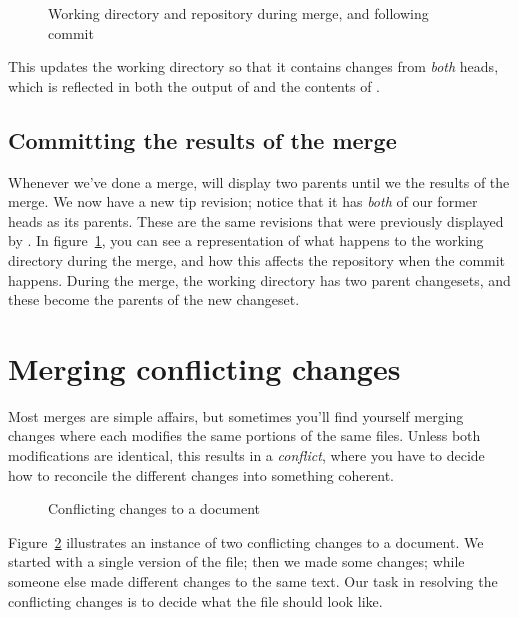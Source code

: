 \begin{figure}[ht]
  \centering
  \caption{Working directory and repository during merge, and
    following commit}
  \label{fig:tour-merge:merge}
\end{figure}

This updates the working directory so that it contains changes from
\emph{both} heads, which is reflected in both the output of
 and the contents of .

\subsection{Committing the results of the merge}

Whenever we've done a merge,  will display two parents
until we  the results of the merge.
We now have a new tip revision; notice that it has \emph{both} of
our former heads as its parents.  These are the same revisions that
were previously displayed by .
In figure~\ref{fig:tour-merge:merge}, you can see a representation of
what happens to the working directory during the merge, and how this
affects the repository when the commit happens.  During the merge, the
working directory has two parent changesets, and these become the
parents of the new changeset.

\section{Merging conflicting changes}

Most merges are simple affairs, but sometimes you'll find yourself
merging changes where each modifies the same portions of the same
files.  Unless both modifications are identical, this results in a
\emph{conflict}, where you have to decide how to reconcile the
different changes into something coherent.

\begin{figure}[ht]
  \centering
  \caption{Conflicting changes to a document}
  \label{fig:tour-merge:conflict}
\end{figure}

Figure~\ref{fig:tour-merge:conflict} illustrates an instance of two
conflicting changes to a document.  We started with a single version
of the file; then we made some changes; while someone else made
different changes to the same text.  Our task in resolving the
conflicting changes is to decide what the file should look like.

